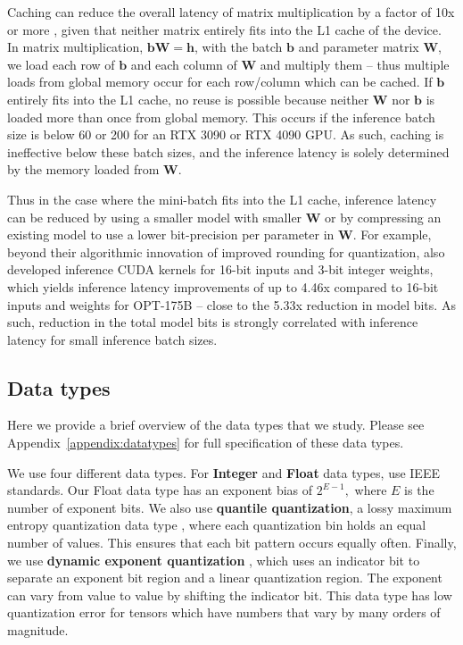 Caching can reduce the overall latency of matrix multiplication by a factor of 10x or more \citep{jia2019dissecting}, given that neither matrix entirely fits into the L1 cache of the device. In matrix multiplication, ${\mathbf{b}\mathbf{W}=\mathbf{h}}$, with the batch $\mathbf{b}$ and parameter matrix $\mathbf{W}$, we load each row of $\mathbf{b}$ and each column of $\mathbf{W}$ and multiply them -- thus multiple loads from global memory occur for each row/column which can be cached. If ${\mathbf{b}}$ entirely fits into the L1 cache, no reuse is possible because neither $\mathbf{W}$ nor ${\mathbf{b}}$ is loaded more than once from global memory. This occurs if the inference batch size is below 60 or 200 for an RTX 3090 or RTX 4090 GPU. As such, caching is ineffective below these batch sizes, and the inference latency is solely determined by the memory loaded from $\mathbf{W}$.

Thus in the case where the mini-batch fits into the L1 cache, inference latency can be reduced by using a smaller model with smaller $\mathbf{W}$ or by compressing an existing model to use a lower bit-precision per parameter in $\mathbf{W}$. For example, beyond their algorithmic innovation of improved rounding for quantization, \citet{frantar2022gptq} also developed inference CUDA kernels for 16-bit inputs and 3-bit integer weights, which yields inference latency improvements of up to 4.46x compared to 16-bit inputs and weights for OPT-175B -- close to the 5.33x reduction in model bits. As such, reduction in the total model bits is strongly correlated with inference latency for small inference batch sizes.

\subsection{Data types}

Here we provide a brief overview of the data types that we study. Please see Appendix~\ref{appendix:datatypes} for full specification of these data types.

We use four different data types. For \textbf{Integer} and \textbf{Float} data types, use IEEE standards. Our Float data type has an exponent bias of $2^{E-1},$ where $E$ is the number of exponent bits. We also use \textbf{quantile quantization}, a lossy maximum entropy quantization data type \citep{dettmers2022optimizers}, where each quantization bin holds an equal number of values. This ensures that each bit pattern occurs equally often. Finally, we use \textbf{dynamic exponent quantization} \citep{dettmers20168bit}, which uses an indicator bit to separate an exponent bit region and a linear quantization region. The exponent can vary from value to value by shifting the indicator bit. This data type has low quantization error for tensors which have numbers that vary by many orders of magnitude. 

